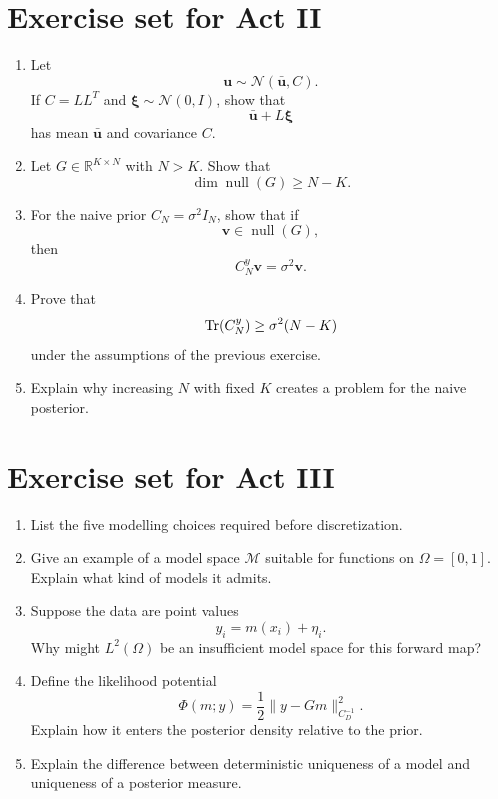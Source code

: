 \documentclass[11pt,a4paper]{book}
\newcommand{\M}{\mathcal{M}}      %
\newcommand{\R}{\mathbb{R}}
\newcommand{\obs}{y}
\newcommand{\G}{G}
\begin{document}
\section{Exercise set for Act II}

\begin{enumerate}[label=\textbf{II.\arabic*.}]
    \item Let
    \[
        \bm{u}\sim\mathcal{N}(\bar{\bm{u}},C).
    \]
    If $C=LL^T$ and $\bm{\xi}\sim\mathcal{N}(0,I)$, show that
    \[
        \bar{\bm{u}}+L\bm{\xi}
    \]
    has mean $\bar{\bm{u}}$ and covariance $C$.

    \item Let $G\in\R^{K\times N}$ with $N>K$. Show that
    \[
        \dim\operatorname{null}(G)\geq N-K.
    \]

    \item For the naive prior $C_N=\sigma^2 I_N$, show that if
    \[
        \bm{v}\in\operatorname{null}(G),
    \]
    then
    \[
        C_N^y\bm{v}=\sigma^2\bm{v}.
    \]

    \item Prove that
    \[
        \Tr(C_N^y)\geq \sigma^2(N-K)
    \]
    under the assumptions of the previous exercise.

    \item Explain why increasing $N$ with fixed $K$ creates a problem for the
    naive posterior.
\end{enumerate}

\section{Exercise set for Act III}

\begin{enumerate}[label=\textbf{III.\arabic*.}]
    \item List the five modelling choices required before discretization.

    \item Give an example of a model space $\M$ suitable for functions on
    $\Omega=[0,1]$. Explain what kind of models it admits.

    \item Suppose the data are point values
    \[
        y_i=m(x_i)+\eta_i.
    \]
    Why might $L^2(\Omega)$ be an insufficient model space for this forward map?

    \item Define the likelihood potential
    \[
        \Phi(m;\obs)
        =
        \frac{1}{2}
        \|\obs-\G m\|_{C_D^{-1}}^2.
    \]
    Explain how it enters the posterior density relative to the prior.

    \item Explain the difference between deterministic uniqueness of a model
    and uniqueness of a posterior measure.
\end{enumerate}
\end{document}
